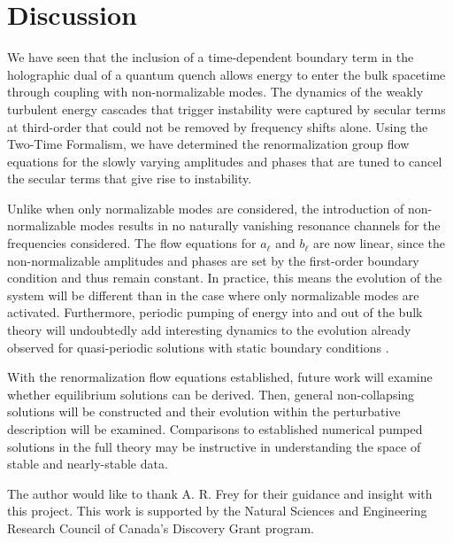 \documentclass[letterpaper,11pt]{article}
\begin{document}

\section{Discussion}
\label{sec: discussion}

We have seen that the inclusion of a time-dependent boundary term in the holographic dual of a quantum quench allows energy to enter the bulk spacetime through coupling with non-normalizable modes. The dynamics of the weakly turbulent energy cascades that trigger instability were captured by secular terms at third-order that could not be removed by frequency shifts alone. Using the Two-Time Formalism, we have determined the renormalization group flow equations for the slowly varying amplitudes and phases that are tuned to cancel the secular terms that give rise to instability. 

Unlike when only normalizable modes are considered, the introduction of non-normalizable modes results in no naturally vanishing resonance channels for the frequencies considered. The flow equations for $a_\ell$ and $b_\ell$ are now linear, since the non-normalizable amplitudes and phases are set by the first-order boundary condition and thus remain constant. In practice, this means the evolution of the system will be different than in the case where only normalizable modes are activated. Furthermore, periodic pumping of energy into and out of the bulk theory will undoubtedly add interesting dynamics to the evolution already observed for quasi-periodic solutions with static boundary conditions \cite{TTF}.

With the renormalization flow equations established, future work will examine whether equilibrium solutions can be derived. Then, general non-collapsing solutions will be constructed and their evolution within the perturbative description will be examined. Comparisons to established numerical pumped solutions in the full theory may be instructive in understanding the space of stable and nearly-stable data.  


\acknowledgments The author would like to thank A. R. Frey for their guidance and insight with this project. This work is supported by the Natural Sciences and Engineering Research Council of Canada's Discovery Grant program.

\end{document}

